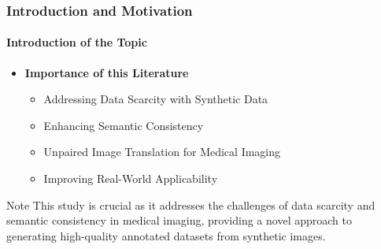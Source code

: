 \documentclass[aspectratio=169, lecture, amberg]{OTHAWbeamer}
\begin{document}
\begin{frame}[t]
    \frametitle{Introduction and Motivation}
    \framesubtitle{Introduction of the Topic}
    
    \vspace{0.2cm} %
    \begin{itemize}
        \item \textbf{Importance of this Literature}
        \vspace{0.4cm}
        \begin{itemize}
            \item Addressing Data Scarcity with Synthetic Data
             \vspace{0.4cm}
            \item Enhancing Semantic Consistency
            \vspace{0.4cm}
            \item Unpaired Image Translation for Medical Imaging
            \vspace{0.4cm}
            \item Improving Real-World Applicability
        \end{itemize}
    \end{itemize}

    \begin{block}{Note}
        This study is crucial as it addresses the challenges of data scarcity and semantic consistency in medical imaging, providing a novel approach to generating high-quality annotated datasets from synthetic images. 
         \end{block}
    
\end{frame}
\end{document}
